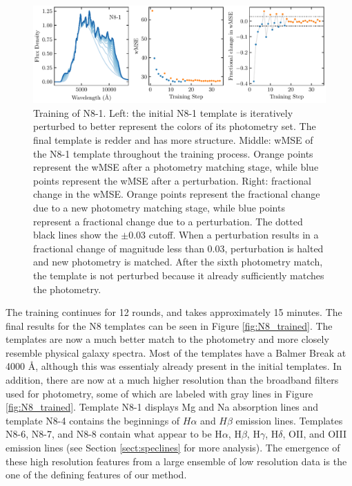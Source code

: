 \begin{figure}
    \centering
    \includegraphics{figures/N8_1_training_history.pdf}
    \caption{Training of N8-1. Left: the initial N8-1 template is iteratively perturbed to better represent the colors of its photometry set. The final template is redder and has more structure. Middle: wMSE of the N8-1 template throughout the training process. Orange points represent the wMSE after a photometry matching stage, while blue points represent the wMSE after a perturbation. Right: fractional change in the wMSE. Orange points represent the fractional change due to a new photometry matching stage, while blue points represent a fractional change due to a perturbation. The dotted black lines show the $\pm 0.03$ cutoff. When a perturbation results in a fractional change of magnitude less than 0.03, perturbation is halted and new photometry is matched. After the sixth photometry match, the template is not perturbed because it already sufficiently matches the photometry.}
    \label{fig:training}
\end{figure}

The training continues for 12 rounds, and takes approximately 15 minutes.
The final results for the N8 templates can be seen in Figure \ref{fig:N8_trained}.
The templates are now a much better match to the photometry and more closely resemble physical galaxy spectra.
Most of the templates have a Balmer Break at 4000 \AA, although this was essentialy already present in the initial templates.
In addition, there are now at a much higher resolution than the broadband filters used for photometry, some of which are labeled with gray lines in Figure \ref{fig:N8_trained}.
Template N8-1 displays Mg and Na absorption lines and template N8-4 contains the beginnings of $H\alpha$ and $H\beta$ emission lines.
Templates N8-6, N8-7, and N8-8 contain what appear to be H$\alpha$, H$\beta$, H$\gamma$, H$\delta$, OII, and OIII emission lines (see Section \ref{sect:speclines} for more analysis).
The emergence of these high resolution features from a large ensemble of low resolution data is the one of the defining features of our method.

